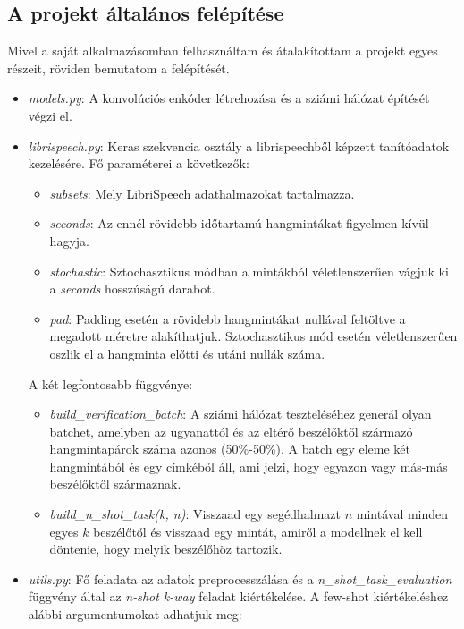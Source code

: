 \subsection{A projekt általános felépítése}

Mivel a saját alkalmazásomban felhasználtam és átalakítottam a projekt egyes részeit,
röviden bemutatom a felépítését.

\begin{itemize}
	\item \emph{models.py}: A konvolúciós enkóder létrehozása és a sziámi hálózat építését végzi el.
	\item \emph{librispeech.py}: Keras szekvencia osztály a librispeechből képzett tanítóadatok kezelésére. Fő paraméterei a következők:
	\begin{itemize}
		\item \emph{subsets}: Mely LibriSpeech adathalmazokat tartalmazza.
		\item \emph{seconds}: Az ennél rövidebb időtartamú hangmintákat figyelmen kívül hagyja.
		\item \emph{stochastic}: Sztochasztikus módban a mintákból véletlenszerűen vágjuk ki a \emph{seconds} hosszúságú darabot.
		\item \emph{pad}: Padding esetén a rövidebb hangmintákat nullával feltöltve a megadott méretre alakíthatjuk. Sztochasztikus mód esetén véletlenszerűen oszlik el a hangminta előtti és utáni nullák száma.
	\end{itemize}
	
	A két legfontosabb függvénye:
	
	\begin{itemize}
		\item \emph{build\_verification\_batch}: A sziámi hálózat teszteléséhez generál olyan batchet, amelyben az ugyanattól és az eltérő beszélőktől származó hangmintapárok száma azonos (50\%-50\%). A batch egy eleme két hangmintából és egy címkéből áll, ami jelzi, hogy egyazon vagy más-más beszélőktől származnak.
		\item \emph{build\_n\_shot\_task(k, n)}: Visszaad egy segédhalmazt $n$ mintával minden egyes $k$ beszélőtől és visszaad egy mintát, amiről a modellnek el kell döntenie, hogy melyik beszélőhöz tartozik.
	\end{itemize}
	\item \emph{utils.py}: Fő feladata az adatok preprocesszálása és a \emph{n\_shot\_task\_evaluation} függvény által az \emph{n-shot k-way} feladat kiértékelése. A few-shot kiértékeléshez alábbi argumentumokat adhatjuk meg:
	

\end{itemize}
